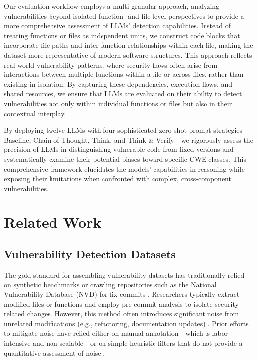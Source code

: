\documentclass[sigconf,review,anonymous]{acmart}
\begin{document}
Our evaluation workflow employs a multi-granular approach, analyzing vulnerabilities beyond isolated function- and file-level perspectives to provide a more comprehensive assessment of LLMs' detection capabilities. Instead of treating functions or files as independent units, we construct code blocks that incorporate file paths and inter-function relationships within each file, making the dataset more representative of modern software structures. This approach reflects real-world vulnerability patterns, where security flaws often arise from interactions between multiple functions within a file or across files, rather than existing in isolation. By capturing these dependencies, execution flows, and shared resources, we ensure that LLMs are evaluated on their ability to detect vulnerabilities not only within individual functions or files but also in their contextual interplay.

By deploying twelve LLMs with four sophisticated zero-shot prompt strategies—Baseline, Chain-of-Thought, Think, and Think \& Verify—we rigorously assess the precision of LLMs in distinguishing vulnerable code from fixed versions and systematically examine their potential biases toward specific CWE classes. This comprehensive framework elucidates the models' capabilities in reasoning while exposing their limitations when confronted with complex, cross-component vulnerabilities.

\section{Related Work}
\label{section:related_work}

\subsection{Vulnerability Detection Datasets}
The gold standard for assembling vulnerability datasets has traditionally relied on synthetic benchmarks or crawling repositories such as the National Vulnerability Database (NVD) for fix commits \cite{bhandari2021cvefixes, chakraborty2021deep, pereira2022software, chen2023diversevul}. Researchers typically extract modified files or functions and employ pre-commit analysis to isolate security-related changes. However, this method often introduces significant noise from unrelated modifications (e.g., refactoring, documentation updates) \cite{iannone2022secret, croft2022noisy}. Prior efforts to mitigate noise have relied either on manual annotation—which is labor-intensive and non-scalable—or on simple heuristic filters that do not provide a quantitative assessment of noise \cite{zhou2019devign, hommersom2024automated, gao2023far, siddiq2022securityeval, fan2020ac}.
\end{document}
